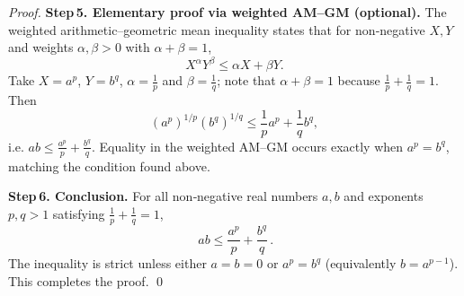 \begin{proof}
\medskip
\textbf{Step 5. Elementary proof via weighted AM–GM (optional).}  
The weighted arithmetic–geometric mean inequality states that for non‑negative \(X,Y\) and weights \(\alpha,\beta>0\) with \(\alpha+\beta=1\),
\[
X^{\alpha}Y^{\beta}\le\alpha X+\beta Y.
\]
Take \(X=a^{p}\), \(Y=b^{q}\), \(\alpha=\frac{1}{p}\) and \(\beta=\frac{1}{q}\); note that \(\alpha+\beta=1\) because \(\frac{1}{p}+\frac{1}{q}=1\).  Then
\[
(a^{p})^{1/p}(b^{q})^{1/q}\le\frac{1}{p}a^{p}+\frac{1}{q}b^{q},
\]
i.e. \(ab\le\frac{a^{p}}{p}+\frac{b^{q}}{q}\).  Equality in the weighted AM–GM occurs exactly when \(a^{p}=b^{q}\), matching the condition found above.

\medskip
\textbf{Step 6. Conclusion.}  
For all non‑negative real numbers \(a,b\) and exponents \(p,q>1\) satisfying \(\frac{1}{p}+\frac{1}{q}=1\),
\[
\boxed{\,ab\le\frac{a^{p}}{p}+\frac{b^{q}}{q}\,}.
\]
The inequality is strict unless either \(a=b=0\) or \(a^{p}=b^{q}\) (equivalently \(b=a^{p-1}\)).  This completes the proof.
\qed
\end{proof}
